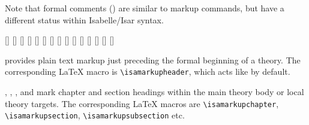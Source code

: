 \begin{isabellebody}
\begin{isamarkuptext}
  Note that formal comments () are similar to
  markup commands, but have a different status within Isabelle/Isar
  syntax.

  \begin{railoutput}
\rail@bar
{}[]
[]
[]
[]
[]
\rail@endbar
\rail@bar
{}
[]
\rail@endbar
{}[]
\rail@end
{}
\rail@bar
{}[]
[]
[]
[]
[]
[]
[]
\rail@endbar
{}[]
\rail@end
\end{railoutput}


  \begin{description}

  \item \hyperlink{command.header}{\mbox{}} provides plain text markup just preceding
  the formal beginning of a theory.  The corresponding {\LaTeX} macro
  is \verb|\isamarkupheader|, which acts like \hyperlink{command.section}{\mbox{}} by default.
  
  \item \hyperlink{command.chapter}{\mbox{}}, \hyperlink{command.section}{\mbox{}}, \hyperlink{command.subsection}{\mbox{}},
  and \hyperlink{command.subsubsection}{\mbox{}} mark chapter and section headings
  within the main theory body or local theory targets.  The
  corresponding {\LaTeX} macros are \verb|\isamarkupchapter|,
  \verb|\isamarkupsection|, \verb|\isamarkupsubsection| etc.


\end{description}
\end{isamarkuptext}
\end{isabellebody}
